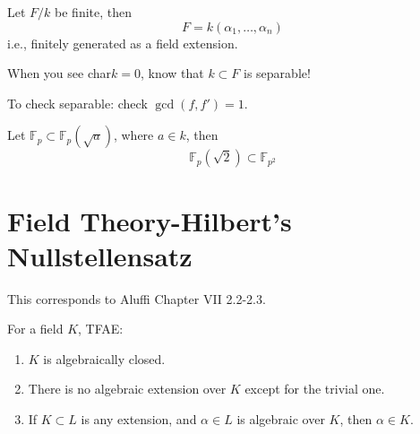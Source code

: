 \documentclass[openany]{book}
\newcommand{\F}{\mathbb{F}}
\begin{document}
\begin{prop}
    Let $F/k$ be finite, then 
    \begin{equation*}
        F=k(\alpha_1,\dots, \alpha_n)
    \end{equation*}
    i.e., finitely generated as a field extension.
\end{prop}


\begin{prop}
    When you see char$k=0$, know that $k\subset F$ is separable!
\end{prop}

\begin{prop}
    To check separable: check $\gcd(f,f')=1$.
\end{prop}


\begin{prop}
    Let $\F_p\subset \F_p(\sqrt{a})$,  where $a\in k$, then 
    \begin{equation*}
        \F_p(\sqrt{2})\subset\F_{p^2}
    \end{equation*}
\end{prop}


















































\chapter{Field Theory-Hilbert's Nullstellensatz}
This corresponds to Aluffi Chapter VII 2.2-2.3.


\begin{prop}
    For a field $K$, TFAE:
    \begin{enumerate}
        \item $K$ is algebraically closed.
        \item There is no algebraic extension over $K$ except for the trivial one.
        \item If $K\subset L$ is any extension, and $\alpha\in L$ is algebraic over $K$, then $\alpha\in K$.
    \end{enumerate}
\end{prop}
\end{document}
